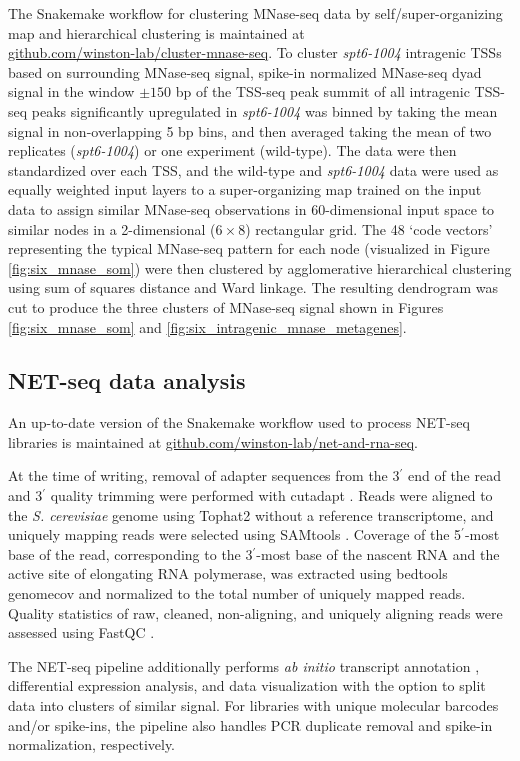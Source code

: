 The Snakemake \citep{koster2012} workflow for clustering MNase-seq data by self/super-organizing map and hierarchical clustering is maintained at\\\href{https://github.com/winston-lab/cluster-mnase-seq}{github.com/winston-lab/cluster-mnase-seq}.
To cluster \textit{spt6-1004} intragenic TSSs based on surrounding MNase-seq signal, spike-in normalized MNase-seq dyad signal in the window $\pm150$ bp of the TSS-seq peak summit of all intragenic TSS-seq peaks significantly upregulated in \textit{spt6-1004} was binned by taking the mean signal in non-overlapping 5 bp bins, and then averaged taking the mean of two replicates (\textit{spt6-1004}) or one experiment (wild-type).
The data were then standardized over each TSS, and the wild-type and \textit{spt6-1004} data were used as equally weighted input layers to a super-organizing map \citep{wehrens2007} trained on the input data to assign similar MNase-seq observations in 60-dimensional input space to similar nodes in a 2-dimensional ($6 \times 8$) rectangular grid.
The 48 `code vectors' representing the typical MNase-seq pattern for each node (visualized in Figure \ref{fig:six_mnase_som}) were then clustered by agglomerative hierarchical clustering using sum of squares distance and Ward linkage.
The resulting dendrogram was cut to produce the three clusters of MNase-seq signal shown in Figures \ref{fig:six_mnase_som} and \ref{fig:six_intragenic_mnase_metagenes}.

\subsection{NET-seq data analysis}
\label{subsec:net_seq}

An up-to-date version of the Snakemake \citep{koster2012} workflow used to process NET-seq libraries is maintained at \href{https://github.com/winston-lab/net-and-rna-seq}{github.com/winston-lab/net-and-rna-seq}.

At the time of writing, removal of adapter sequences from the 3$^\prime$ end of the read and 3$^\prime$ quality trimming were performed with cutadapt \citep{martin2011}.
Reads were aligned to the \textit{S. cerevisiae} genome using Tophat2 \citep{kim2013} without a reference transcriptome, and uniquely mapping reads were selected using SAMtools \citep{li2009}.
Coverage of the 5$^\prime$-most base of the read, corresponding to the 3$^\prime$-most base of the nascent RNA and the active site of elongating RNA polymerase, was extracted using bedtools genomecov \citep{quinlan2010} and normalized to the total number of uniquely mapped reads.
Quality statistics of raw, cleaned, non-aligning, and uniquely aligning reads were assessed using FastQC \citep{andrews2010}.

The NET-seq pipeline additionally performs \textit{ab initio} transcript annotation \citep{pertea2015}, differential expression analysis, and data visualization with the option to split data into clusters of similar signal.
For libraries with unique molecular barcodes and/or spike-ins, the pipeline also handles PCR duplicate removal and spike-in normalization, respectively.

\clearpage

\begingroup
    \singlespacing
    
\endgroup
